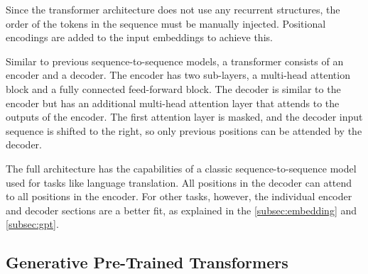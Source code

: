 \documentclass[../main.tex]{subfiles}
\begin{document}
Since the transformer architecture does not use any recurrent structures,
the order of the tokens in the sequence must be manually injected.
Positional encodings are added to the input embeddings to achieve this.

Similar to previous sequence-to-sequence models,
a transformer consists of an encoder and a decoder.
The encoder has two sub-layers,
a multi-head attention block
and a fully connected feed-forward block.
The decoder is similar to the encoder
but has an additional multi-head attention layer
that attends to the outputs of the encoder.
The first attention layer is masked,
and the decoder input sequence is shifted to the right,
so only previous positions can be
attended by the decoder.

The full architecture has the capabilities of a classic sequence-to-sequence model
used for tasks like language translation.
All positions in the decoder can attend to all positions in the encoder.
For other tasks, however,
the individual encoder and decoder sections are a better fit,
as explained in the \autoref{subsec:embedding} and \autoref{subsec:gpt}.

\subsection{Generative Pre-Trained Transformers}
\label{subsec:gpt}
\end{document}
